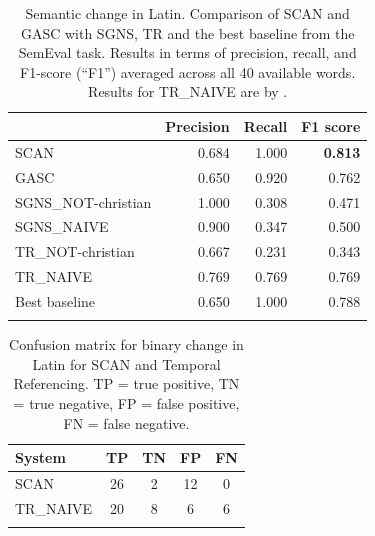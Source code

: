 \documentclass[output=paper%
]{langscibook}
\begin{document}
\begin{table}
\begin{tabular}{lrrr}
\lsptoprule
\multicolumn{1}{l}{Latin (BCE/CE)} & \multicolumn{1}{c}{Precision} & \multicolumn{1}{c}{Recall} & \multicolumn{1}{c}{F1 score}\\ \midrule
SCAN                  & 0.684 & 1.000 & \textbf{0.813}   \\
GASC                  & 0.650 & 0.920 & 0.762  \\
SGNS\_NOT-christian   & 1.000 & 0.308 & 0.471  \\
SGNS\_NAIVE           & 0.900 & 0.347 & 0.500  \\
TR\_NOT-christian     & 0.667 & 0.231 & 0.343  \\
TR\_NAIVE             & 0.769 & 0.769 & 0.769  \\
Best baseline         & 0.650 & 1.000 & 0.788  \\ \lspbottomrule
\end{tabular}
\caption{Semantic change in Latin. Comparison of SCAN and GASC with SGNS, TR and the best baseline from the SemEval task. Results in terms of precision, recall, and F1-score (``F1'') averaged across all 40 available words. Results for TR\_NAIVE are by \citet{zhou-etal-2020-temporalteller}.\label{table:binary_change}}
\end{table}


\begin{table}
\begin{tabular}{lcccc}
\lsptoprule
System      & TP & TN & FP & FN \\ \midrule
SCAN        & 26 & 2  & 12 & 0  \\ 
TR\_NAIVE   & 20 & 8  & 6  & 6  \\ \lspbottomrule
\end{tabular}
\caption{Confusion matrix for binary change in Latin for SCAN and Temporal Referencing. TP = true positive, TN = true negative, FP = false positive, FN = false negative.\label{tab:confusion-matrix}}
\end{table}
\end{document}
